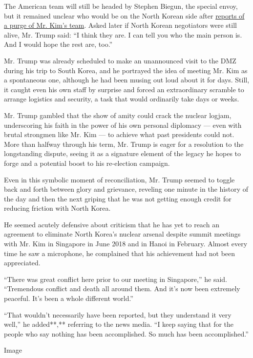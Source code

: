 The American team will still be headed by Stephen Biegun, the special
envoy, but it remained unclear who would be on the North Korean side
after
\href{https://www.nytimes3xbfgragh.onion/2019/06/02/world/asia/north-korean-purge-kim.html}{reports
of a purge of Mr. Kim's team}. Asked later if North Korean negotiators
were still alive, Mr. Trump said: ``I think they are. I can tell you who
the main person is. And I would hope the rest are, too.''

Mr. Trump was already scheduled to make an unannounced visit to the DMZ
during his trip to South Korea, and he portrayed the idea of meeting Mr.
Kim as a spontaneous one, although he had been musing out loud about it
for days. Still, it caught even his own staff by surprise and forced an
extraordinary scramble to arrange logistics and security, a task that
would ordinarily take days or weeks.

Mr. Trump gambled that the show of amity could crack the nuclear logjam,
underscoring his faith in the power of his own personal diplomacy ---
even with brutal strongmen like Mr. Kim --- to achieve what past
presidents could not. More than halfway through his term, Mr. Trump is
eager for a resolution to the longstanding dispute, seeing it as a
signature element of the legacy he hopes to forge and a potential boost
to his re-election campaign.

Even in this symbolic moment of reconciliation, Mr. Trump seemed to
toggle back and forth between glory and grievance, reveling one minute
in the history of the day and then the next griping that he was not
getting enough credit for reducing friction with North Korea.

He seemed acutely defensive about criticism that he has yet to reach an
agreement to eliminate North Korea's nuclear arsenal despite summit
meetings with Mr. Kim in Singapore in June 2018 and in Hanoi in
February. Almost every time he saw a microphone, he complained that his
achievement had not been appreciated.

``There was great conflict here prior to our meeting in Singapore,'' he
said. ``Tremendous conflict and death all around them. And it's now been
extremely peaceful. It's been a whole different world.''

``That wouldn't necessarily have been reported, but they understand it
very well,'' he added**,** referring to the news media. ``I keep saying
that for the people who say nothing has been accomplished. So much has
been accomplished.''

Image

